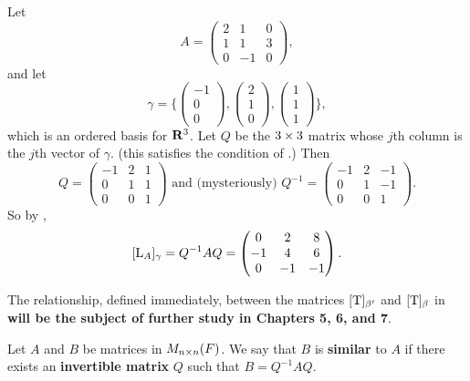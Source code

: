 \begin{example} \label{example 2.5.4}
Let
\[
    A = \begin{pmatrix}
        2 & 1 & 0 \\ 1 & 1 & 3 \\ 0 & -1 & 0
    \end{pmatrix},
\]
and let
\[
    \gamma = \bigg\{
        \begin{pmatrix} -1 \\ 0 \\ 0 \end{pmatrix}, 
        \begin{pmatrix} 2 \\ 1 \\ 0 \end{pmatrix}, 
        \begin{pmatrix} 1 \\ 1 \\ 1 \end{pmatrix}
    \bigg\},
\]
which is an ordered basis for \(\mathbf{R}^3\).
Let \(Q\) be the \(3 \times 3\) matrix whose \(j\)th column is the \(j\)th vector of \(\gamma\). (this satisfies the condition of .)
Then
\[
    Q = \begin{pmatrix} -1 & 2 & 1 \\ 0 & 1 & 1 \\ 0 & 0 & 1 \end{pmatrix}
    \text{ and (mysteriously) }
    Q^{-1} = \begin{pmatrix} -1 & 2 & -1 \\ 0 & 1 & -1 \\ 0 & 0 & 1 \end{pmatrix}.
\]
So by ,
\[
    [\mathrm{L}_A]_{\gamma} = Q^{-1} A Q = \begin{pmatrix} 0 & 2 & 8 \\ -1 & 4 & 6 \\ 0 & -1 & -1 \end{pmatrix}.
\]
\end{example}

\begin{remark} \label{remark 2.5.2}
The relationship, defined immediately, between the matrices \([\mathrm{T}]_{\beta'}\) and \([\mathrm{T}]_{\beta}\) in  \textbf{will be the subject of further study in Chapters 5, 6, and 7}.
\end{remark}

\begin{definition} \label{def 2.16}
Let \(A\) and \(B\) be matrices in \(M_{n \times n}(F)\).
We say that \(B\) is \textbf{similar}\textbf{} to \(A\) if there exists an \textbf{invertible matrix} \(Q\) such that \(B = Q^{-1} A Q\).
\end{definition}

